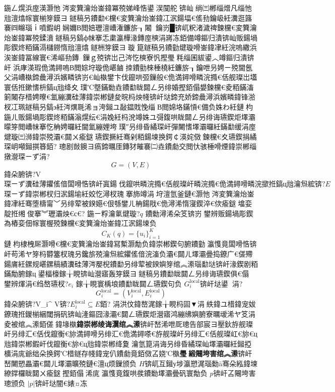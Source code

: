 {{{{{{{{{{{{{{{鍦ㄥ熀浜庢渶灏忚涔変簨瀹炲崟鍏冪殑娣峰悎鍙洖闃舵锛屾绱㈢郴缁熷凡缁忚兘澶熻幏寰椾笌鏌ヨ鐩稿叧鐨勫€欓€変簨瀹炲崟鍏冮泦鍚堛€傜劧鑰岋紝瀵逛簬褰㈣矊瑙ｉ噴鍜岄娴嬭В閲婄瓑澶嶆潅鐮旂┒闂鑰岃█锛屼粎渚濊禆鍊欓€変簨瀹炲崟鍏冪殑鍒濆鐩稿叧鎬ф帓搴忎粛瀛樺湪鏄庢樉涓嶈冻銆備竴鏂归潰锛屾贩鍚堝彫鍥炵粨鏋滆櫧鐒惰兘澶熻鐩栦笌鏌ヨ璇箟鐩稿叧鐨勭煡璇嗗崟鍏冿紝浣嗚繖浜涘崟鍏冨線寰€浠嶇劧鏄鏁ｇ殑锛岀己涔忔樉寮忛摼璺粍缁囷紱鍙︿竴鏂归潰锛屽浜庨渶瑕佹満鐞嗚В閲婃垨璇佹嵁鏀拺鐨勯棶棰橈紝鐮旂┒鑰呭叧娉ㄧ殑閫氬父涓嶆槸鍗曟潯浜嬪疄锛岃€屾槸鐢卞伐鑹哄弬鏁般€佹満鐞嗗疄浣撱€佸舰璨岀壒寰佸拰鏉愭枡鎬ц兘绛夊璞℃墍鏋勬垚鐨勫眬閮ㄥ叧绯婚摼銆傝嫢鍊欓€夌粨鏋滀箣闂存棤娉曢€氳繃瀵硅薄鍏崇郴鏈夋晥杩炴帴锛屽垯鍗充娇鍗曟潯浜嬪疄鍏锋湁杈冮珮鐩稿叧鎬э紝涔熼毦浠ョ洿鎺ユ敮鎾戝悗缁В閲婂垎鏋愩€備负姝わ紝鏈枃鍦ㄦ贩鍚堝彫鍥炵粨鏋滃熀纭€涓婏紝杩涗竴姝ユ彁鍑哄眬閮ㄥ叧绯诲瓙鍥炬墿灞曚笌閲嶆帓搴忔柟娉曪紝閫氳繃娌垮璞″叧绯昏繘琛屽彈闄愭墿灞曪紝鏋勫缓涓庢煡璇㈢浉鍏崇殑灞€閮ㄨ瘉鎹瓙鍥撅紝骞剁粨鍚堜换鍔￠渶姹傚鍊欓€夊瓙鍥捐繘琛岄噸鎺掑簭銆?
璁剧敱鐭ヨ瘑鍗曞厓鏄犲皠褰㈡垚鐨勮交閲忕骇棰嗗煙鍏崇郴缁撴瀯琛ㄧず涓?\begin{equation}
G=(V,E)
\end{equation}
鍏朵腑锛?V$ 琛ㄧず瀵硅薄鑺傜偣闆嗗悎锛屽寘鍚伐鑹哄疄浣撱€佸舰璨屽疄浣撱€佹満鐞嗗疄浣撳拰鎬ц兘瀹炰綋锛?E$ 琛ㄧず鍏崇郴杈归泦鍚堬紝姣忔潯杈瑰搴斾竴涓垨澶氫釜鏈€灏忚涔変簨瀹炲崟鍏冿紝骞堕檮甯﹀叧绯荤被鍨嬨€佷綔鐢ㄦ柟鍚戙€佹潯浠惰寖鍥淬€佽瘉鎹墖娈靛拰缃俊搴︾瓑灞炴€с€?
鍦ㄧ粰瀹氭煡璇?$q$ 鐨勬潯浠朵笅锛岃鐢辨贩鍚堝彫鍥為樁娈佃幏寰楃殑鍊欓€変簨瀹炲崟鍏冮泦鍚堜负
\begin{equation}
C_K(q)=\{u_i\}_{i=1}^{K}
\end{equation}
鏈枃棣栧厛灏嗗€欓€変簨瀹炲崟鍏冩槧灏勪负鍏崇郴鍥句腑鐨勭瀛愯竟闆嗗悎锛屽苟浠ヤ笌杩欎簺杈瑰叧鑱旂殑瀹炰綋鑺傜偣浣滀负灞€閮ㄦ墿灞曡捣鐐广€傞殢鍚庯紝鏍规嵁鏍稿績瀵硅薄涔嬮棿鐨勫叧绯荤被鍨嬩笌绾︽潫瑙勫垯锛屽湪鍥剧粨鏋勪腑鎵ц鍙楅檺鎵╁睍锛屾瀯寤轰笌鏌ヨ鐩稿叧鐨勫眬閮ㄥ叧绯诲瓙鍥俱€傝鐢辨煇涓€绉嶅瓙杈?$e_i$ 鎵╁睍寰楀埌鐨勫眬閮ㄥ瓙鍥句负 $G_i^{\mathrm{local}}$锛屽垯鍙涓?\begin{equation}
G_i^{\mathrm{local}}=(V_i^{\mathrm{local}},E_i^{\mathrm{local}})
\end{equation}
鍏朵腑锛?V_i^{} \subseteq V$锛?E_i^{\mathrm{local}} \subseteq E$銆?
涓洪伩鍏嶅浘鎵╁睍杩囩▼涓紩鍏ユ棤鍏宠妭鐐瑰拰鍐椾綑閾捐矾锛屾湰鏂囧湪灞€閮ㄥ瓙鍥炬瀯寤鸿繃绋嬩腑寮曞叆浠ヤ笅涓夌被绾︽潫銆傞鍏堟槸\textbf{鍏崇郴绫诲瀷绾︽潫}锛屽嵆浠呭厑璁告部宸ヨ壓鈥斿舰璨屽叧绯汇€佸伐鑹衡€旀満鐞嗗叧绯汇€佹満鐞嗏€斿舰璨屽叧绯汇€佸舰璨屸€旀€ц兘鍏崇郴鍜屽伐鑹衡€旀€ц兘鍏崇郴绛夐瀹氫箟涓诲叧绯昏繘琛屾墿灞曪紝鎺掗櫎涓庣爺绌朵换鍔℃棤鐩存帴鍏宠仈鐨勮竟銆傚叾娆℃槸\textbf{璺緞闀垮害绾︽潫}锛屽嵆闄愬畾灞€閮ㄦ墿灞曠殑鏈€澶ц烦鏁颁负 $H$锛屼互鎺у埗瀛愬浘瑙勬ā骞朵紭鍏堜繚鐣欏眬閮ㄨ瘉鎹摼銆傝浠庣瀛愯竟鍑哄彂鐨勬墿灞曡矾寰勪负 $p$锛屽叾闀垮害璁颁负 $|p|$锛屽垯闇€婊¤冻
}}}}}}}}}}}}}}}

